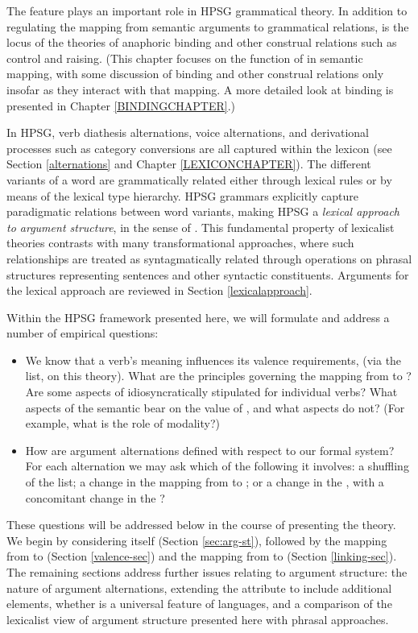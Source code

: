 \documentclass[output=paper]{langsci/langscibook}
\begin{document}
The \argst feature plays an important  
role in HPSG grammatical theory.  In addition to regulating the mapping from semantic arguments to grammatical relations, \argst is the locus of the theories of anaphoric binding and other construal relations such as control and raising.  (This chapter focuses on the function of \argst  in semantic mapping, with some discussion of binding and other construal relations only insofar as they interact with that mapping.  A more detailed look at binding is presented in Chapter \ref{BINDINGCHAPTER}.)   

In HPSG, verb diathesis alternations, voice alternations, and derivational processes such as category conversions are all captured within the lexicon (see Section \ref{alternations} and Chapter \ref{LEXICONCHAPTER}).  The different variants of a word are grammatically related either through lexical rules or by means of the lexical type hierarchy.  HPSG grammars explicitly capture paradigmatic relations between word variants, making HPSG a \textit{lexical approach to argument structure}, in the sense of \citet{MWArgSt}.
This fundamental property of lexicalist theories contrasts with many transformational approaches, where such relationships are treated as syntagmatically related through operations on phrasal structures representing sentences and other syntactic constituents.  Arguments for the lexical approach are reviewed in Section \ref{lexicalapproach}.  

Within the HPSG framework presented here, we will formulate and address a number of empirical questions: 

\begin{itemize}
\item We know that a verb's meaning influences its valence requirements, (via the \argst list, on this theory). 
 What are the principles governing the mapping from \content to \argst?  Are some aspects of \argst idiosyncratically stipulated for individual verbs?  What aspects of the semantic \content  bear on the value of \argst, and what aspects do not?  (For example, what is the role of modality?)  
\item How are argument alternations defined with respect to our formal system?  For each alternation we may ask which of the following it involves: a shuffling of the \argst list;  a change in the mapping from \argst to \val; or  a change in the \content, with a concomitant change in the \argst?  
\end{itemize}

\noindent
These questions will be addressed below in the course of presenting the theory.  We begin by considering \argst itself (Section \ref{sec:arg-st}), followed by the mapping from \argst to \val (Section \ref{valence-sec}) and the mapping from \content to \argst (Section \ref{linking-sec}).  
The remaining sections address further issues relating to argument structure: the nature of argument alternations, extending the \argst attribute to include additional elements, whether \argst is a universal feature of languages, and a comparison of the lexicalist view of argument structure presented here with phrasal approaches.
\end{document}
